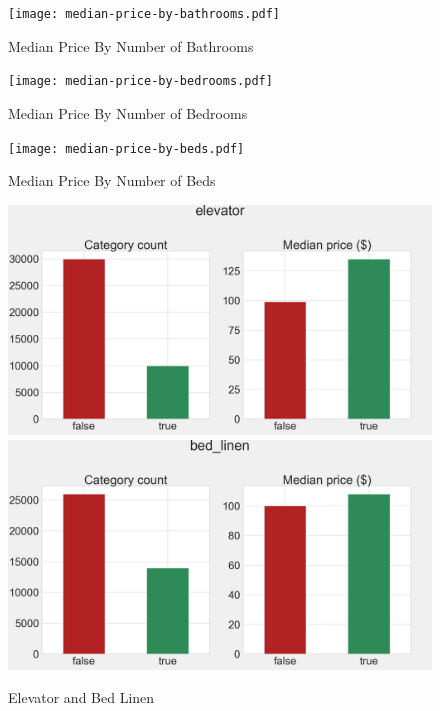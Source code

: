 \begin{figure}[H] \centering
    \texttt{[image: median-price-by-bathrooms.pdf]}
    \caption{Median Price By  Number of Bathrooms }
    \label{fig:median-price-by-bathrooms}
\end{figure}

\begin{figure}[H] \centering
    \texttt{[image: median-price-by-bedrooms.pdf]}
    \caption{Median Price By Number of Bedrooms}
    \label{fig:median-price-by-bedrooms}
\end{figure}


\begin{figure}[H] \centering
    \texttt{[image: median-price-by-beds.pdf]}
    \caption{Median Price By Number of Beds}
    \label{fig:median-price-by-beds}
\end{figure}


\begin{figure}[H]
\centering
    \caption{Elevator and Bed Linen}
    \includegraphics[width=\linewidth]{figures/amenities/group1/elevator.png}
    \vspace{0.3cm}
    \includegraphics[width=\linewidth]{figures/amenities/group1/bed_linen.png}
    \label{fig:elevator-and-bed-linen}
\end{figure}


